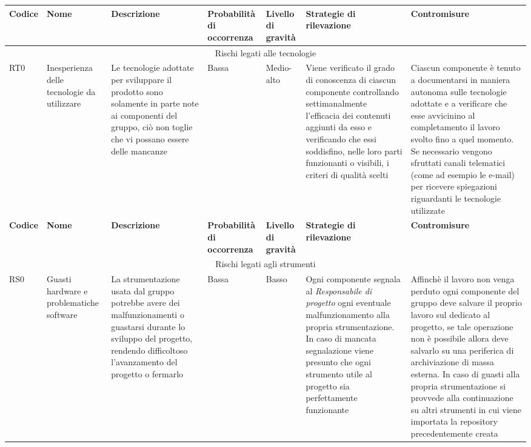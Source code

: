 \documentclass[../PianodiProgetto.tex]{subfiles}
\begin{document}
\setlength\LTleft{-35.5mm}
\raggedleft
	\begin{longtable}{|p{15mm}|p{23.5mm}|p{38mm}|p{22mm}|p{19mm}|p{30mm}|p{30mm}|}
		\hline \textbf{Codice} & \textbf{Nome} & \textbf{Descrizione} & \textbf{Probabilità di occorrenza} & \textbf{Livello di gravità} & \textbf{Strategie di rilevazione} & \textbf{Contromisure} \\
		
		\hline\multicolumn{7}{|c|}{Rischi legati alle tecnologie} \\
		
		\hline RT0 & Inesperienza delle tecnologie da utilizzare & Le tecnologie adottate per sviluppare il prodotto sono solamente in parte note ai componenti del gruppo, ciò non toglie che vi possano essere delle mancanze & Bassa & Medio-alto & Viene verificato il grado di conoscenza di ciascun componente controllando settimanalmente l'efficacia dei contenuti aggiunti da esso e verificando che essi soddisfino, nelle loro parti funzionanti o visibili, i criteri di qualità scelti & Ciascun componente è tenuto a documentarsi in maniera autonoma sulle tecnologie adottate e a verificare che esse avvicinino al completamento il lavoro svolto fino a quel momento. Se necessario vengono sfruttati canali telematici (come ad esempio le e-mail) per ricevere spiegazioni riguardanti le tecnologie utilizzate \\
		\hline

		\newpage
	
		\hline \textbf{Codice} & \textbf{Nome} & \textbf{Descrizione} & \textbf{Probabilità di occorrenza} & \textbf{Livello di gravità} & \textbf{Strategie di rilevazione} & \textbf{Contromisure} \\
		
		\hline\multicolumn{7}{|c|}{Rischi legati agli strumenti} \\
		
		\hline RS0 & Guasti hardware e problematiche software & La strumentazione usata dal gruppo potrebbe avere dei malfunzionamenti o guastarsi durante lo sviluppo del progetto, rendendo difficoltoso l'avanzamento del progetto o fermarlo & Bassa & Basso & Ogni componente segnala al \textit{Responsabile di progetto} ogni eventuale malfunzionamento  alla propria strumentazione. In caso di mancata segnalazione viene presunto che ogni strumento utile al progetto sia perfettamente funzionante & Affinchè il lavoro non venga perduto ogni componente del gruppo deve salvare il proprio lavoro sul \glossario{repository}{Repository} \glossario{GitHub}{GitHub} dedicato al progetto, se tale operazione non è possibile allora deve salvarlo su una periferica di archiviazione di massa esterna. In caso di guasti alla propria strumentazione si provvede alla continuazione su altri strumenti in cui viene importata la repository precedentemente creata \\
		\hline
	

\end{longtable}
\end{document}
